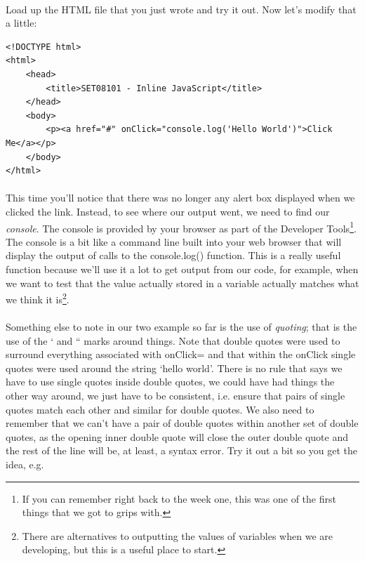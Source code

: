\documentclass[10pt, a4paper, twosize]{article}
\begin{document}
\paragraph{} Load up the HTML file that you just wrote and try it out. Now let's modify that a little:

\begin{lstlisting}
<!DOCTYPE html>
<html>
    <head>
        <title>SET08101 - Inline JavaScript</title>
    </head>
    <body>
        <p><a href="#" onClick="console.log('Hello World')">Click Me</a></p> 
    </body>
</html>
\end{lstlisting}

\paragraph{} This time you'll notice that there was no longer any alert box displayed when we clicked the link. Instead, to see where our output went, we need to find our \emph{console}. The console is provided by your browser as part of the Developer Tools\footnote{If you can remember right back to the week one, this was one of the first things that we got to grips with.}. The console is a bit like a command line built into your web browser that will display the output of calls to the console.log() function. This is a really useful function because we'll use it a lot to get output from our code, for example, when we want to test that the value actually stored in a variable actually matches what we think it is\footnote{There are alternatives to outputting the values of variables when we are developing, but this is a useful place to start.}.

\paragraph{} Something else to note in our two example so far is the use of \emph{quoting}; that is the use of the ` and `` marks around things. Note that double quotes were used to surround everything associated with onClick= and that within the onClick single quotes were used around the string `hello world'. There is no rule that says we have to use single quotes inside double quotes, we could have had things the other way around, we just have to be consistent, i.e. ensure that pairs of single quotes match each other and similar for double quotes. We also need to remember that we can't have a pair of double quotes within another set of double quotes, as the opening inner double quote will close the outer double quote and the rest of the line will be, at least, a syntax error. Try it out a bit so you get the idea, e.g.
\end{document}
